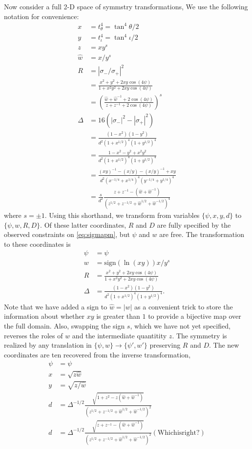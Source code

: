 \documentclass[aps,showpacs,twocolumn,prd,superscriptaddress,nofootinbib]{revtex4}
\newcommand\C{{\cos(4\psi)}}
\begin{document}
Now consider a full 2-D space of symmstry transformations,
We use the following notation for convenience:
\begin{align}
  x&=t^4_{\theta}=\tan^4{\theta/2}\\
  y&=t^4_{\iota}=\tan^4{\iota/2}\\
  z&=xy^s\\
  \hat w&=x/y^s\\
  R&=|\sigma_-/\sigma_+|^2\\
  &=\frac{x^2+y^2+2xy\C}{1+x^2y^2+2xy\C}\\
  &=\left(\frac{\hat w+\hat w^{-1}+2\C}{z+z^{-1}+2\C}\right)^s\\
  \Delta&=16(|\sigma_-|^2-|\sigma_+|^2)\\
  &=\frac{(1-x^2)(1-y^2)}{d^2(1+x^{1/2})^4(1+y^{1/2})^4}\\
  &=\frac{1-x^2-y^2+x^2y^2}{d^2(1+x^{1/2})^4(1+y^{1/2})^4}\\
  &=\frac{(xy)^{-1}-(x/y)-(x/y)^{-1}+xy}{d^2(x^{-1/4}+x^{1/4})^4(y^{-1/4}+y^{1/4})^4}\\
  &=\frac{s}{d^2}\frac{z+z^{-1}-(\hat w+{\hat w}^{-1})}{(z^{1/2}+z^{-1/2}+{\hat w}^{1/2}+{\hat w}^{-1/2})^4}
\end{align}
where $s=\pm1$.
Using this shorthand, we transform from variables $\{\psi,x,y,d\}$ to $\{\psi,w,R,D\}$.
Of these latter coordinates, $R$ and $D$ are fully specified by the observed constraints on \eqref{eq:sigmapm},
but $\psi$ and $w$ are free. The transformation to these coordinates is
\begin{align}
  \psi&=\psi\\
  w&=\mathrm{sign}(\ln(xy))x/y^s\\
  R&=\frac{x^2+y^2+2xy\C}{1+x^2y^2+2xy\C}\\
  \Delta&=\frac{(1-x^2)(1-y^2)}{d^2(1+x^{1/2})^4(1+y^{1/2})^4}.
\end{align}
Note that we have added a sign to ${\hat w}=|w|$ as a convenient trick to
store the information about whether $xy$ is greater than $1$ to provide a bijective map over the full domain. 
Also, swapping the sign $s$, which we have not yet specified, reverses the roles of $w$ and the intermediate quantitity $z$.
The symmetry is realized by any translation in $\{\psi,w\}\rightarrow\{\psi',w'\}$ preserving $R$ and $D$.
The new coordinates are ten recovered from the inverse transformation, 
\begin{align}
  \psi&=\psi\\
  x&=\sqrt{z\hat w}\\
  y&=\sqrt{z/{\hat w}}\\
  d&={\Delta^{-1/2}}\frac {\sqrt{1+z^2-z(\hat w+{\hat w}^{-1})}}{(z^{1/2}+z^{-1/2}+{\hat w}^{1/2}+{\hat w}^{-1/2})^2}\\
  d&={\Delta^{-1/2}}\frac {\sqrt{z+z^{-1}-(\hat w+{\hat w}^{-1})}}{(z^{1/2}+z^{-1/2}+{\hat w}^{1/2}+{\hat w}^{-1/2})^2} \mathrm{(Which is right?)}
\end{align}
\end{document}
